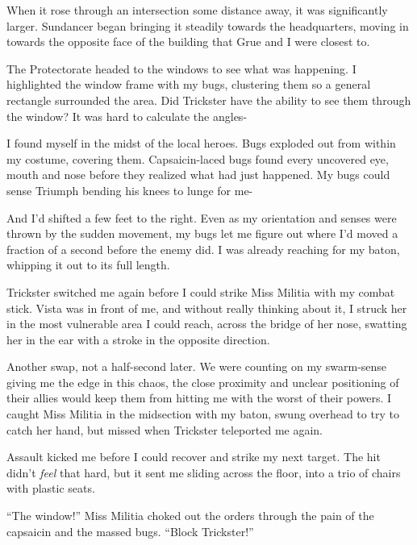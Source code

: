 When it rose through an intersection some distance away, it was significantly larger.  Sundancer began bringing it steadily towards the headquarters, moving in towards the opposite face of the building that Grue and I were closest to.



The Protectorate headed to the windows to see what was happening.  I highlighted the window frame with my bugs, clustering them so a general rectangle surrounded the area.  Did Trickster have the ability to see them through the window?  It was hard to calculate the angles-



I found myself in the midst of the local heroes.  Bugs exploded out from within my costume, covering them.  Capsaicin-laced bugs found every uncovered eye, mouth and nose before they realized what had just happened.  My bugs could sense Triumph bending his knees to lunge for me-



And I'd shifted a few feet to the right.  Even as my orientation and senses were thrown by the sudden movement, my bugs let me figure out where I'd moved a fraction of a second before the enemy did.  I was already reaching for my baton, whipping it out to its full length.



Trickster switched me again before I could strike Miss Militia with my combat stick.  Vista was in front of me, and without really thinking about it, I struck her in the most vulnerable area I could reach, across the bridge of her nose, swatting her in the ear with a stroke in the opposite direction.



Another swap, not a half-second later.  We were counting on my swarm-sense giving me the edge in this chaos, the close proximity and unclear positioning of their allies would keep them from hitting me with the worst of their powers.  I caught Miss Militia in the midsection with my baton, swung overhead to try to catch her hand, but missed when Trickster teleported me again.



Assault kicked me before I could recover and strike my next target.  The hit didn't \emph{feel} that hard, but it sent me sliding across the floor, into a trio of chairs with plastic seats.



``The window!'' Miss Militia choked out the orders through the pain of the capsaicin and the massed bugs.  ``Block Trickster!''



